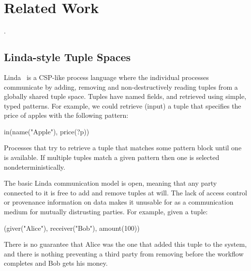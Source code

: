 
\clearpage{}

\label{s:Related}
\section{Related Work}

.


\subsection{Linda-style Tuple Spaces}
Linda~\cite{Gelernter1985:Linda} is a CSP-like process language where the individual processes communicate by adding, removing and non-destructively reading tuples from a globally shared tuple space. Tuples have named fields, and retrieved using simple, typed patterns. For example, we could retrieve (input) a tuple that specifies the price of apples with the following pattern:
\begin{code}
   in(name("Apple"), price(?p))
\end{code}
Processes that try to retrieve a tuple that matches some pattern block until one is available. If multiple tuples match a given pattern then one is selected nondeterministically.

The basic Linda communication model is open, meaning that any party connected to it is free to add and remove tuples at will. The lack of access control or provenance information on data makes it unusable for as a communication medium for mutually distrusting parties. For example, given a tuple:
\begin{code}
   (giver("Alice"), receiver("Bob"), amount(100))
\end{code}
There is no guarantee that Alice was the one that added this tuple to the system, and there is nothing preventing a third party from removing before the workflow completes and Bob gets his money.

